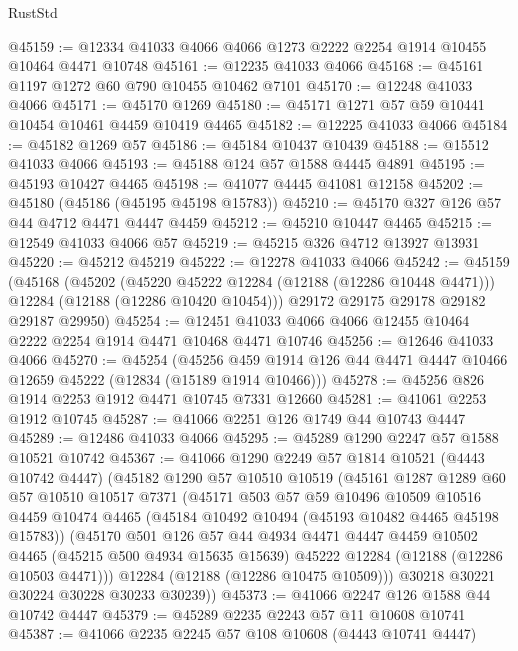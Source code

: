 \begin{lexlean}{RustStd}
\begin{coremodule}
@45159 := @12334 @41033 @4066 @4066 @1273 @2222 @2254 @1914 @10455 @10464 @4471 @10748
@45161 := @12235 @41033 @4066
@45168 := @45161 @1197 @1272 @60 @790 @10455 @10462 @7101
@45170 := @12248 @41033 @4066
@45171 := @45170 @1269
@45180 := @45171 @1271 @57 @59 @10441 @10454 @10461 @4459 @10419 @4465
@45182 := @12225 @41033 @4066
@45184 := @45182 @1269 @57
@45186 := @45184 @10437 @10439
@45188 := @15512 @41033 @4066
@45193 := @45188 @124 @57 @1588 @4445 @4891
@45195 := @45193 @10427 @4465
@45198 := @41077 @4445 @41081 @12158
@45202 := @45180 (@45186 (@45195 @45198 @15783))
@45210 := @45170 @327 @126 @57 @44 @4712 @4471 @4447 @4459
@45212 := @45210 @10447 @4465
@45215 := @12549 @41033 @4066 @57
@45219 := @45215 @326 @4712 @13927 @13931
@45220 := @45212 @45219
@45222 := @12278 @41033 @4066
@45242 := @45159
    (@45168
      (@45202
        (@45220 @45222 @12284 (@12188 (@12286 @10448 @4471)))
        @12284
        (@12188 (@12286 @10420 @10454)))
      @29172
      @29175
      @29178
      @29182
      @29187
      @29950)
@45254 := @12451 @41033 @4066 @4066 @12455 @10464 @2222 @2254 @1914 @4471 @10468 @4471 @10746
@45256 := @12646 @41033 @4066
@45270 := @45254
    (@45256 @459 @1914 @126 @44 @4471 @4447 @10466 @12659 @45222 (@12834 (@15189 @1914 @10466)))
@45278 := @45256 @826 @1914 @2253 @1912 @4471 @10745 @7331 @12660
@45281 := @41061 @2253 @1912 @10745
@45287 := @41066 @2251 @126 @1749 @44 @10743 @4447
@45289 := @12486 @41033 @4066
@45295 := @45289 @1290 @2247 @57 @1588 @10521 @10742
@45367 := @41066
    @1290
    @2249
    @57
    @1814
    @10521
    (@4443 @10742 @4447)
    (@45182
      @1290
      @57
      @10510
      @10519
      (@45161
        @1287
        @1289
        @60
        @57
        @10510
        @10517
        @7371
        (@45171
          @503
          @57
          @59
          @10496
          @10509
          @10516
          @4459
          @10474
          @4465
          (@45184 @10492 @10494 (@45193 @10482 @4465 @45198 @15783))
          (@45170
            @501
            @126
            @57
            @44
            @4934
            @4471
            @4447
            @4459
            @10502
            @4465
            (@45215 @500 @4934 @15635 @15639)
            @45222
            @12284
            (@12188 (@12286 @10503 @4471)))
          @12284
          (@12188 (@12286 @10475 @10509)))
        @30218
        @30221
        @30224
        @30228
        @30233
        @30239))
@45373 := @41066 @2247 @126 @1588 @44 @10742 @4447
@45379 := @45289 @2235 @2243 @57 @11 @10608 @10741
@45387 := @41066 @2235 @2245 @57 @108 @10608 (@4443 @10741 @4447)

\end{coremodule}
\end{lexlean}
